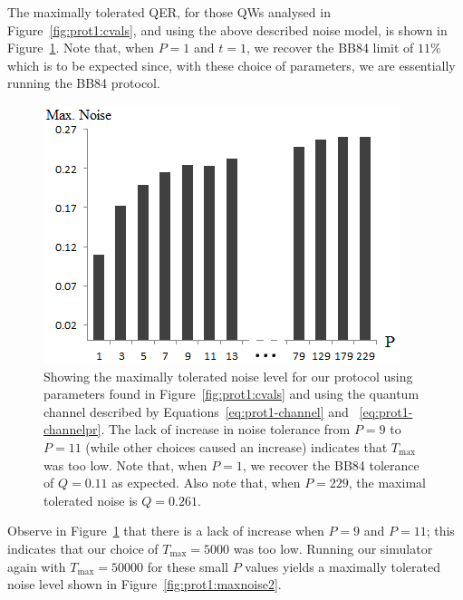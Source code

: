 The maximally tolerated QER, for those QWs analysed in Figure~\ref{fig:prot1:cvals}, and using the above described noise model, is shown in Figure~\ref{fig:prot1:maxnoise1}.  Note that, when $P=1$ and $t=1$, we recover the BB84 limit of $11\%$ which is to be expected since, with these choice of parameters, we are essentially running the BB84 protocol.
\begin{figure}[h!]
  \centering
  \includegraphics[scale=0.6]{maxNoisePiOver4.png}
\caption{Showing the maximally tolerated noise level for our protocol using parameters found in Figure~\ref{fig:prot1:cvals} and using the quantum channel described by Equations~\eqref{eq:prot1-channel} and~ \eqref{eq:prot1-channelpr}. The lack of increase in noise tolerance from $P=9$ to $P=11$ (while other choices caused an increase) indicates that $T_{\max}$ was too low.  Note that, when $P = 1$, we recover the BB84 tolerance of $Q = 0.11$ as expected.  Also note that, when $P = 229$, the maximal tolerated noise is $Q = 0.261$.}\label{fig:prot1:maxnoise1}
\end{figure}
Observe in Figure~\ref{fig:prot1:maxnoise1} that there is a lack of increase when $P=9$ and $P=11$; this indicates that our choice of $T_{\max} = 5000$ was too low.  Running our simulator again with $T_{\max} = 50000$ for these small $P$ values yields a maximally tolerated noise level shown in Figure~\ref{fig:prot1:maxnoise2}.

